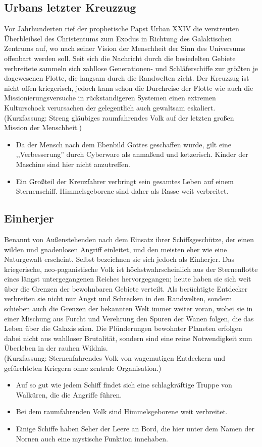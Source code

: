 \documentclass[10pt,a4paper]{report}
\begin{document}
\subsection*{Urbans letzter Kreuzzug}
Vor Jahrhunderten rief der prophetische Papst Urban XXIV die verstreuten Überbleibsel des Christentums zum Exodus in Richtung des Galaktischen Zentrums auf, wo nach seiner Vision der Menschheit der Sinn des Universums offenbart werden soll. Seit sich die Nachricht durch die besiedelten Gebiete verbreitete sammeln sich zahllose Generationen- und Schläferschiffe zur größten je dagewesenen Flotte, die langsam durch die Randwelten zieht. Der Kreuzzug ist nicht offen kriegerisch, jedoch kann schon die Durchreise der Flotte wie auch die Missionierungsversuche in rückstandigeren Systemen einen extremen Kulturschock verursachen der gelegentlich auch gewaltsam eskaliert.\\
(Kurzfassung: Streng gläubiges raumfahrendes Volk auf der letzten großen Mission der Menschheit.)
\begin{itemize}
\item Da der Mensch nach dem Ebenbild Gottes geschaffen wurde, gilt eine ,,Verbesserung'' durch Cyberware als anmaßend und ketzerisch. Kinder der Maschine sind hier nicht anzutreffen.
\item Ein Großteil der Kreuzfahrer verbringt sein gesamtes Leben auf einem Sternenschiff. Himmelsgeborene sind daher als Rasse weit verbreitet.
\end{itemize}

\subsection*{Einherjer}
Benannt von Außenstehenden nach dem Einsatz ihrer Schiffsgeschütze, der einen wilden und gnadenlosen Angriff einleitet, und den meisten eher wie eine Naturgewalt erscheint. Selbst bezeichnen sie sich jedoch als Einherjer. Das kriegerische, neo-paganistische Volk ist höchstwahrscheinlich aus der Sternenflotte eines längst untergegangenen Reiches hervorgegangen; heute haben sie sich weit über die Grenzen der bewohnbaren Gebiete verteilt. Als berüchtigte Entdecker verbreiten sie nicht nur Angst und Schrecken in den Randwelten, sondern schieben auch die Grenzen der bekannten Welt immer weiter voran, wobei sie in einer Mischung aus Furcht und Verehrung den Spuren der Wanen folgen, die das Leben über die Galaxis säen. Die Plünderungen bewohnter Planeten erfolgen dabei nicht aus wahlloser Brutalität, sondern sind eine reine Notwendigkeit zum Überleben in der rauhen Wildnis.\\
(Kurzfassung: Sternenfahrendes Volk von wagemutigen Entdeckern und gefürchteten Kriegern ohne zentrale Organisation.)
\begin{itemize}
\item Auf so gut wie jedem Schiff findet sich eine schlagkräftige Truppe von Walküren, die die Angriffe führen.
\item Bei dem raumfahrenden Volk sind Himmelsgeborene weit verbreitet.
\item Einige Schiffe haben Seher der Leere an Bord, die hier unter dem Namen der Nornen auch eine mystische Funktion innehaben.
\end{itemize}
\end{document}
